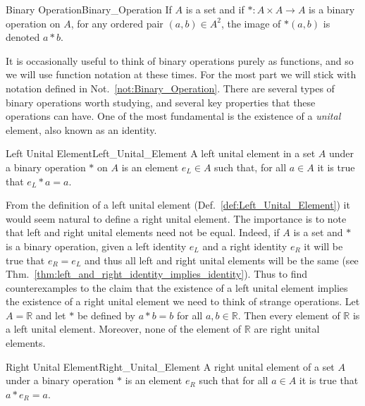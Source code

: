     \begin{fnotation}{Binary Operation}{Binary_Operation}
        If $A$ is a set and if $*:A\times{A}\rightarrow{A}$ is a binary
        operation on $A$, for any ordered pair $(a,b)\in{A}^{2}$, the image
        of $*(a,b)$ is denoted $a*b$.
    \end{fnotation}
    It is occasionally useful to think of binary operations purely as functions,
    and so we will use function notation at these times. For the most part we
    will stick with notation defined in Not.~\ref{not:Binary_Operation}. There
    are several types of binary operations worth studying, and several key
    properties that these operations can have. One of the most fundamental is
    the existence of a \textit{unital} element, also known as an identity.
    \begin{fdefinition}{Left Unital Element}{Left_Unital_Element}
        A left unital element in a \gls{set} $A$ under a \gls{binary operation}
        $*$ on $A$ is an element $e_{L}\in{A}$ such that, for all $a\in{A}$ it
        is true that $e_{L}*a=a$.
    \end{fdefinition}
    \begin{example}
        From the definition of a left unital element
        (Def.~\ref{def:Left_Unital_Element}) it would seem natural to define a
        right unital element. The importance is to note that left and right
        unital elements need not be equal. Indeed, if $A$ is a set and $*$ is
        a binary operation, given a left identity $e_{L}$ and a right identity
        $e_{R}$ it will be true that $e_{R}=e_{L}$ and thus all left and right
        unital elements will be the same
        (see Thm.~\ref{thm:left_and_right_identity_implies_identity}). Thus to
        find counterexamples to the claim that the existence of a left unital
        element implies the existence of a right unital element we need to think
        of strange operations. Let $A=\mathbb{R}$ and let $*$ be defined by
        $a*b=b$ for all $a,b\in\mathbb{R}$. Then every element of $\mathbb{R}$
        is a left unital element. Moreover, none of the element of $\mathbb{R}$
        are right unital elements.
    \end{example}
    \begin{fdefinition}{Right Unital Element}{Right_Unital_Element}
        A right unital element of a \gls{set} $A$ under a \gls{binary operation}
        $*$ is an element $e_{R}$ such that for all $a\in{A}$ it is true that
        $a*e_{R}=a$.
    \end{fdefinition}

